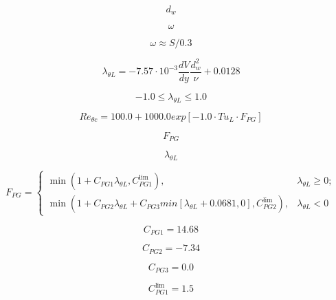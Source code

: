 \begin{equation}
d_w
\end{equation}

\begin{equation}
\omega
\end{equation}

\begin{equation}
\omega \approx S/0.3
\end{equation}

\begin{equation}
\lambda _{\theta L}=-7.57\cdot 
10^{-3}\frac{dV}{dy}\frac{d_{w}^{2}}{\nu }+0.0128
\end{equation}

\begin{equation}
-1.0 \leq \lambda _{\theta L} \leq 1.0
\end{equation}

\begin{equation}
Re_{\theta c}=100.0+1000.0exp[-1.0 \cdot Tu_{L} \cdot F_{PG}]
\end{equation}

\begin{equation}
F_{PG}
\end{equation}

\begin{equation}
\lambda_{\theta L}
\end{equation}

\begin{equation}
F_{PG}= \left\{
   \begin{array}{ll}
      \min (1+C_{PG1}\lambda _{\theta L},   C_{PG1}^{\lim }), & \lambda _{\theta L}\ge 0; \\
      \min (1+C_{PG2}\lambda _{\theta L}+C_{PG3}min[\lambda _{\theta 
      L}+0.0681, 0],   C_{PG2}^{\lim }), & \lambda _{\theta L}<0
    \end{array} \right.
\end{equation}

\begin{equation}
C_{PG1}=14.68
\end{equation}

\begin{equation}
C_{PG2}=-7.34
\end{equation}

\begin{equation}
C_{PG3}=0.0
\end{equation}

\begin{equation}
C_{PG1}^{\lim }=1.5
\end{equation}

